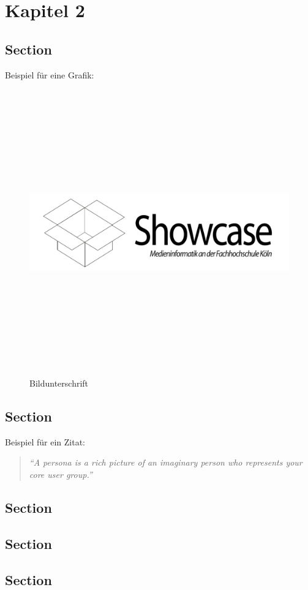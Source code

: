 \chapter{Kapitel 2}

\section{Section}
\label{sec:section}

Beispiel für eine Grafik:
\begin{figure}[!ht]
	\centering
		\includegraphics[width=1200pt, height=349pt, width=1.0\textwidth]{images/showcase.pdf}
	\caption{Bildunterschrift}
	\label{fig:showcase}
\end{figure}

\section{Section}
Beispiel für ein Zitat:
\begin{quotation}
	\textit{\enquote{A persona is a rich picture of an imaginary person who represents your core user group.}} \cite{Dix04}
\end{quotation}


\section{Section}

\section{Section}

\section{Section}